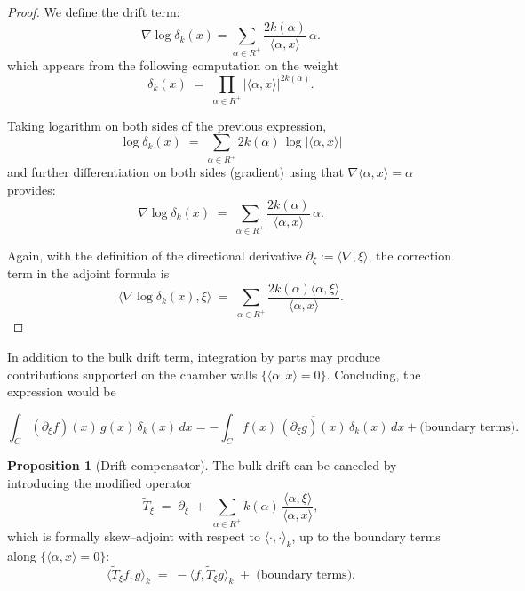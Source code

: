 \documentclass[12pt]{article}
\newcommand{\1}{\mathbbm{1}}
\theoremstyle{definition}
\newtheorem{proposition}{Proposition}
\begin{document}
\begin{proof}
We define the drift term:
\begin{equation}\label{driftdef}
  \nabla \log \delta_{k}(x)
  = \sum_{\alpha \in R^{+}} \frac{2k(\alpha)}{\langle \alpha,x\rangle}\, \alpha .
\end{equation}
\noindent
which appears from the following computation on the weight
\[
  \delta_k(x) \;=\; \prod_{\alpha \in R^+} |\langle \alpha , x \rangle|^{2k(\alpha)} .
\]

Taking logarithm on both sides of the previous expression, 
\[
  \log \delta_k(x)
  \;=\; \sum_{\alpha \in R^+} 2k(\alpha)\, \log |\langle \alpha , x \rangle| 
\]
\noindent
and further differentiation on both sides (gradient) using that \(\nabla \langle \alpha , x \rangle = \alpha\) provides:
\[
  \nabla \log \delta_k(x)
  \;=\; \sum_{\alpha \in R^+} \frac{2k(\alpha)}{\langle \alpha , x \rangle}\, \alpha .
\]


Again, with the definition of  the directional derivative
\(\partial_\xi := \langle \nabla , \xi \rangle\),  the correction term in the adjoint formula is
\[
  \langle \nabla \log \delta_k(x), \xi \rangle
  \;=\; \sum_{\alpha \in R^+} 
         \frac{2k(\alpha)\langle \alpha , \xi \rangle}{\langle \alpha , x \rangle}.
\]


\end{proof}


In addition to the bulk drift term, integration by parts may
produce contributions supported on the chamber walls
$\{\langle \alpha, x \rangle = 0\}$. Concluding, the expression would be

\begin{equation}\label{factor2}
  \int_{C} (\partial_{\xi} f)(x)\, \overline{g(x)}\, \delta_{k}(x)\, dx
  = - \int_{C} f(x)\, \overline{(\partial_{\xi} g)(x)}\, \delta_{k}(x)\, dx
    + \text{(boundary terms)}.
\end{equation}



\begin{proposition}[Drift compensator]
The bulk drift can be canceled by introducing the modified operator
\begin{equation}\label{eq:localcomp}
  \widetilde{T}_{\xi}
  \;=\; \partial_{\xi}
  \;+\; \sum_{\alpha \in R^{+}} k(\alpha)\,
       \frac{\langle \alpha, \xi \rangle}{\langle \alpha, x \rangle},
\end{equation}
which is formally skew--adjoint with
respect to $\langle \cdot , \cdot \rangle_{k}$, up to the boundary terms along
$\{\langle \alpha, x \rangle = 0\}$:
\[
  \langle \widetilde{T}_{\xi} f, g \rangle_{k}
  \;=\; - \langle f, \widetilde{T}_{\xi} g \rangle_{k}
        \;+\; \text{(boundary terms)}.
\]
\end{proposition}
\end{document}
